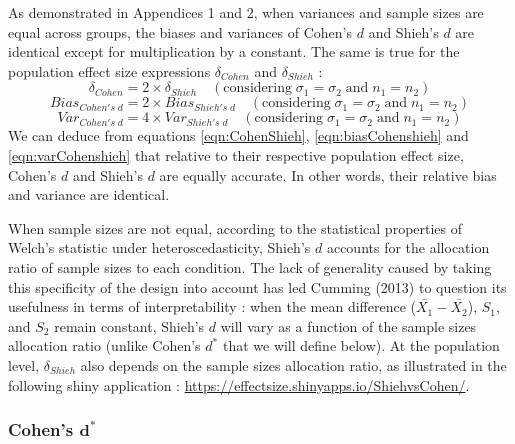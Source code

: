 \documentclass[
  english,
  man,floatsintext]{apa6}
\begin{document}
As demonstrated in Appendices 1 and 2, when variances and sample sizes are equal across groups, the biases and variances of Cohen's \(d\) and Shieh's \(d\) are identical except for multiplication by a constant. The same is true for the population effect size expressions \(\delta_{Cohen}\) and \(\delta_{Shieh}\) :\\
\begin{equation} 
\delta_{Cohen} = 2 \times \delta_{Shieh} \quad (\mbox{considering} \; \sigma_1 = \sigma_2 \; \mbox{and} \; n_1 = n_2)
\label{eqn:CohenShieh}
\end{equation}
\begin{equation} 
Bias_{Cohen's \; d} = 2 \times Bias_{Shieh's \; d} \quad (\mbox{considering} \; \sigma_1 = \sigma_2 \; \mbox{and} \; n_1 = n_2)
\label{eqn:biasCohenshieh}
\end{equation}
\begin{equation} 
Var_{Cohen's \; d} = 4 \times Var_{Shieh's \; d} \quad (\mbox{considering}\; \sigma_1 = \sigma_2 \; \mbox{and} \; n_1 = n_2)
\label{eqn:varCohenshieh}
\end{equation}
We can deduce from equations \ref{eqn:CohenShieh}, \ref{eqn:biasCohenshieh} and \ref{eqn:varCohenshieh} that relative to their respective population effect size, Cohen's \(d\) and Shieh's \(d\) are equally accurate. In other words, their relative bias and variance are identical.

When sample sizes are not equal, according to the statistical properties of Welch's statistic under heteroscedasticity, Shieh's \(d\) accounts for the allocation ratio of sample sizes to each condition. The lack of generality caused by taking this specificity of the design into account has led Cumming (2013) to question its usefulness in terms of interpretability : when the mean difference (\(\bar{X_1}-\bar{X_2}\)), \(S_1\), and \(S_2\) remain constant, Shieh's \(d\) will vary as a function of the sample sizes allocation ratio (unlike Cohen's \(d^*\) that we will define below). At the population level, \(\delta_{Shieh}\) also depends on the sample sizes allocation ratio, as illustrated in the following shiny application : \url{https://effectsize.shinyapps.io/ShiehvsCohen/}.

\hypertarget{cohens-bmd}{%
\subsubsection{\texorpdfstring{Cohen's \(\bm{d^*}\)}{Cohen's \textbackslash bm\{d\^{}*\}}}\label{cohens-bmd}}
\end{document}
